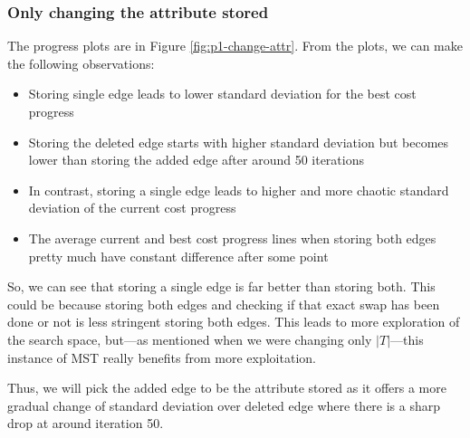 \subsubsection{Only changing the attribute stored}

The progress plots are in Figure \ref{fig:p1-change-attr}. From the plots, we can make the following observations:
\begin{itemize}
    \item Storing single edge leads to lower standard deviation for the best cost progress
    \item Storing the deleted edge starts with higher standard deviation but becomes lower than storing the added edge after around 50 iterations
    \item In contrast, storing a single edge leads to higher and more chaotic standard deviation of the current cost progress
    \item The average current and best cost progress lines when storing both edges pretty much have constant difference after some point
\end{itemize}

So, we can see that storing a single edge is far better than storing both. This could be because storing both edges and checking if that exact swap has been done or not is less stringent storing both edges. This leads to more exploration of the search space, but---as mentioned when we were changing only \(|T|\)---this instance of MST really benefits from more exploitation. 

Thus, we will pick the added edge to be the attribute stored as it offers a more gradual change of standard deviation over deleted edge where there is a sharp drop at around iteration 50.

